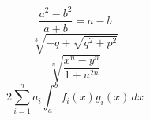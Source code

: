 \documentclass{article}
\newcounter{saveeqn}
\newcounter{prenum}
\newcommand{\vareqn}[2]{\setcounter{saveeqn}{\value{equation}}%
   \setcounter{equation}{0}\setcounter{prenum}{#1}
   \renewcommand{\theequation}{\arabic{prenum}[#2{equation}]}}
\newcommand{\reseteqn}{\setcounter{equation}{\value{saveeqn}}%
   \renewcommand{\theequation}{\arabic{equation}}}
\begin{document}
\setcounter{equation}{9}
\vareqn{33}{\Alph}
\begin{equation} \frac{a^2 - b^2}{a + b} = a - b \end{equation}
\begin{equation} \sqrt[3]{-q + \sqrt{q^2 + p^2}} \end{equation}
\begin{equation} \sqrt[n]{\frac{x^n - y^n}{1 + u^{2n}}} \end{equation}
\reseteqn
\begin{equation} 2\sum_{i=1}^n a_i \int^b_a f_i(x) g_i(x)\,dx \end{equation}
\end{document}
